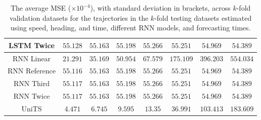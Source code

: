 \begin{table}[!ht]
{\begin{tabular}{|c|c|c|c|c|c|c|c|}
			LSTM Twice & $55.128$ & $55.163$ & $55.198$ & $55.266$ & $55.251$ & $54.969$ & $54.389$ \\ \hline
			RNN Linear & $21.291$ & $35.169$ & $50.954$ & $67.579$ & $175.109$ & $396.203$ & $554.034$ \\ \hline
			RNN Reference & $55.116$ & $55.163$ & $55.198$ & $55.266$ & $55.251$ & $54.969$ & $54.389$ \\ \hline
			RNN Third & $55.117$ & $55.163$ & $55.198$ & $55.266$ & $55.251$ & $54.969$ & $54.389$ \\ \hline
			RNN Twice & $55.117$ & $55.163$ & $55.198$ & $55.266$ & $55.251$ & $54.969$ & $54.389$ \\ \hline
			UniTS & $4.471$ & $6.745$ & $9.595$ & $13.35$ & $36.991$ & $103.413$ & $183.609$ \\ \hline
		\end{tabular}
	}
	\caption{The average MSE ($\times 10^{-4}$), with standard deviation in brackets, across $k$-fold validation datasets for the trajectories in the $k$-fold testing datasets estimated using speed, heading, and time, different RNN models, and forecasting times.}
	\label{tab:all_speed_actual_dir_MSE}
\end{table}